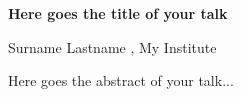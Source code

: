 \documentclass[12pt,twopage]{book}
\begin{document}

\textbf{Here goes the title of your talk}

Surname Lastname , My Institute 


Here goes the abstract of your talk...

\end{document}
